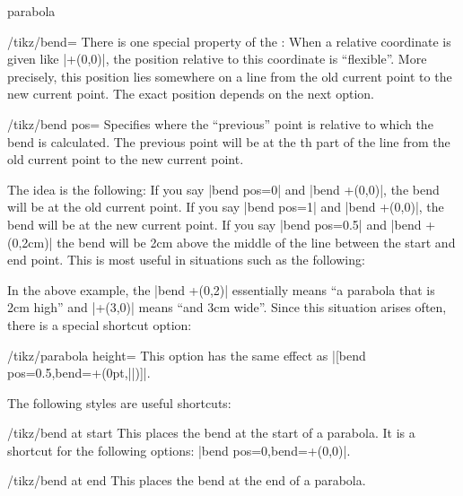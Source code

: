 \begin{pathoperation}{parabola}{}
\begin{key}{/tikz/bend=}
        There is one special property of the : When a relative
        coordinate is given like |+(0,0)|, the position relative to this
        coordinate is ``flexible''. More precisely, this position lies
        somewhere on a line from the old current point to the new current
        point. The exact position depends on the next option.
    \end{key}

    \begin{key}{/tikz/bend pos=}
        Specifies where the ``previous'' point is relative to which the bend is
        calculated. The previous point will be at the th part of
        the line from the old current point to the new current point.

        The idea is the following: If you say |bend pos=0| and |bend +(0,0)|,
        the bend will be at the old current point. If you say |bend pos=1| and
        |bend +(0,0)|, the bend will be at the new current point. If you say
        |bend pos=0.5| and |bend +(0,2cm)| the bend will be 2cm above the
        middle of the line between the start and end point. This is most useful
        in situations such as the following:
\begin{codeexample}[]
\end{codeexample}

        In the above example, the |bend +(0,2)| essentially means ``a parabola
        that is 2cm high'' and |+(3,0)| means ``and 3cm wide''. Since this
        situation arises often, there is a special shortcut option:
        \begin{key}{/tikz/parabola height=}
            This option has the same effect as
            |[bend pos=0.5,bend={+(0pt,||)}]|.
\begin{codeexample}[]
\end{codeexample}
        \end{key}
    \end{key}

    The following styles are useful shortcuts:
    \begin{stylekey}{/tikz/bend at start}
        This places the bend at the start of a parabola. It is a shortcut for
        the following options: |bend pos=0,bend={+(0,0)}|.
    \end{stylekey}

    \begin{stylekey}{/tikz/bend at end}
        This places the bend at the end of a parabola.
    \end{stylekey}
\end{pathoperation}


